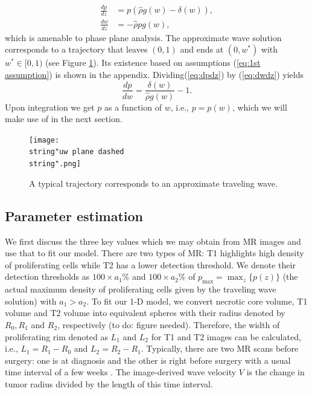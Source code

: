 \documentclass{aims}
\numberwithin{equation}{section}
\begin{document}
\begin{subequations}\label{eq:pp system}
\begin{align}
\frac{dp}{dz} & =p(\hat{\rho}g(w)-\delta(w)),\label{eq:dpdz}\\
\frac{dw}{dz} & =-\hat{\rho}pg(w),\label{eq:dwdz}
\end{align}
\end{subequations}which is amenable to phase plane analysis. The
approximate wave solution corresponds to a trajectory that leaves
$(0,1)$ and ends at $(0,w^{*})$ with $w^{*}\in[0,1)$ (see Figure
\ref{fig:pp}). Its existence based on assumptions (\ref{eq:1st assumption})
is shown in the appendix. Dividing(\ref{eq:dpdz}) by (\ref{eq:dwdz}) yields 
\[
\frac{dp}{dw}=\frac{\delta(w)}{\hat{\rho}g(w)}-1.
\]
 Upon integration we get $p$ as a function of $w$, i.e., $p=p(w)$,
which we will make use of in the next section. 

\begin{figure}
\begin{center}
\texttt{[image: \\string"uw plane dashed\\string".png]}\caption{\label{fig:pp}A typical trajectory corresponds to an approximate traveling
wave.}
\end{center}
\end{figure}

\subsection{Parameter estimation}

We first discuss the three key values which we may obtain
from MR images and use that to fit our model. There are two types of MR: T1
highlights high density of proliferating cells while T2 has a lower
detection threshold. We denote their detection thresholds as $100\times a_{1}\%$
and $100\times a_{2}\%$ of $p_{\max}=\max_{z}\{p(z)\}$ (the actual
maximum density of proliferating cells given by the traveling wave
solution) with $a_{1}>a_{2}$. To fit our 1-D model, we convert necrotic
core volume, T1 volume and T2 volume into equivalent spheres with
their radius denoted by $R_{0},R_{1}$ and $R_{2}$, respectively (to do: figure
needed). Therefore, the width of proliferating rim denoted as $L_{1}$
and $L_{2}$ for T1 and T2 images can be calculated, i.e., $L_{1}=R_{1}-R_{0}$
and $L_{2}=R_{2}-R_{1}$. Typically, there are two MR scans before
surgery: one is at diagnosis and the other is right before surgery
with a usual time interval of a few weeks \cite{Swanson2008}. The
image-derived wave velocity $V$ is the change in tumor radius divided
by the length of this time interval. 
\end{document}
